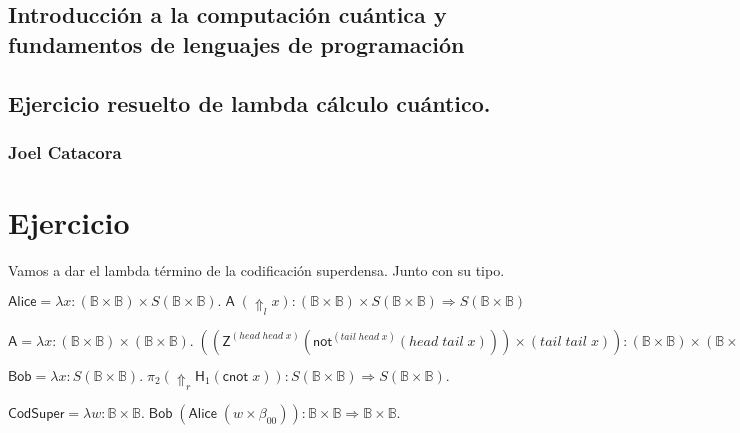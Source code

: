 \documentclass[a4paper,11pt]{article}
\title{}
\author{}
\begin{document}
\maketitle 

\thispagestyle{empty}
\begin{center}
\section*{Introducción a  la computación cuántica y fundamentos de lenguajes de programación} 
\subsection*{Ejercicio resuelto de lambda cálculo cuántico.}
\subsubsection*{Joel Catacora}

\end{center}

\newpage{\pagestyle{empty}\cleardoublepage}

\newpage

\section*
{Ejercicio}

Vamos a dar el lambda término de la codificación superdensa. Junto con su tipo.

$ \textsf{Alice} = \lambda x : (\mathds{B} \times \mathds{B}) \times S (\mathds{B} \times \mathds{B}). \; \textsf{A} \; (\Uparrow_{l} x)
 : (\mathds{B} \times  \mathds{B}) \times S(\mathds{B} \times \mathds{B}) \Rightarrow S(\mathds{B} \times \mathds{B})$


$ \textsf{A} = \lambda x: (\mathds{B} \times \mathds{B}) \times (\mathds{B} \times \mathds{B}). \; ((\textsf{Z}^{(head \; head \; x)} 
  (\textsf{not}^{(tail \; head \; x)} (head \; tail \; x))) \times (tail \; tail \; x)) 
  : (\mathds{B} \times  \mathds{B}) \times (\mathds{B} \times  \mathds{B}) 
  \Rightarrow \mathds{B} \times \mathds{B}.$

$ \textsf{Bob} = \lambda x : S(\mathds{B} \times \mathds{B}). \; \pi_{2} (\Uparrow_{r} \textsf{H}_{1} (\textsf{cnot} \; x)) 
  : S(\mathds{B} \times \mathds{B}) \Rightarrow S(\mathds{B} \times \mathds{B}).$

$ \textsf{CodSuper} = \lambda w : \mathds{B} \times \mathds{B}. \; \textsf{Bob} \; (\textsf{Alice} \; (w \times \beta_{00}) ) 
  : \mathds{B} \times \mathds{B} \Rightarrow \mathds{B} \times \mathds{B}.$
\end{document}
